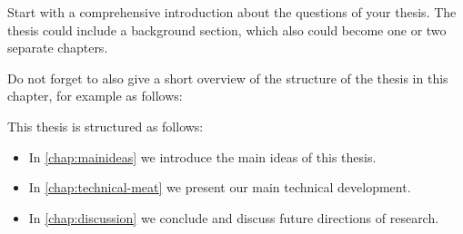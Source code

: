 Start with a comprehensive introduction about the questions of your thesis.
The thesis could include a background section, which also could become one or two separate chapters.

Do not forget to also give a short overview of the structure of the thesis in this chapter, for example as follows:

\medskip
This thesis is structured as follows:
\begin{itemize}
    \item In \cref{chap:mainideas} we introduce the main ideas of this thesis.
    \item In \cref{chap:technical-meat} we present our main technical development.
    \item In \cref{chap:discussion} we conclude and discuss future directions of research.
\end{itemize} 
